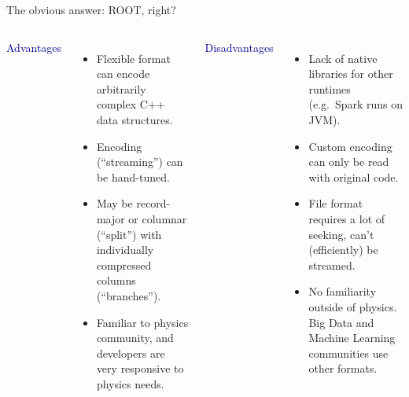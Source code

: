 \documentclass{beamer}
\begin{document}
\begin{frame}{The obvious answer: ROOT, right?}
\vspace{0.25 cm}
\begin{columns}[t]
\textcolor{darkblue}{Advantages}

\begin{itemize}
\item Flexible format can encode arbitrarily complex C++ data structures.

\item Encoding (``streaming'') can be hand-tuned.

\item May be record-major or columnar (``split'') with individually compressed columns (``branches'').

\item Familiar to physics community, and developers are very responsive to physics needs.

\end{itemize}

\textcolor{darkblue}{Disadvantages}

\begin{itemize}
\item Lack of native libraries for other runtimes (e.g.\ Spark runs on JVM).

\item Custom encoding can only be read with original code.

\item File format requires a lot of seeking, can't (efficiently) be streamed.

\item No familiarity outside of physics. Big Data and Machine Learning communities use other formats.
\end{itemize}
\end{columns}
\end{frame}
\end{document}
